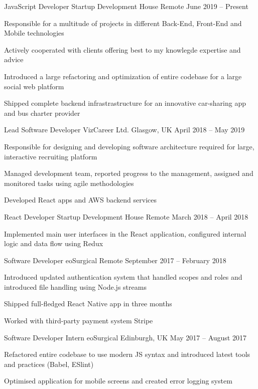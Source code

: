 \documentclass[]{awesome-cv}
\begin{document}
\vspace{-5mm}
\begin{cventries}
  \cventry
  {JavaScript Developer}
  {Startup Development House}
  {Remote}
  {June 2019 – Present}
  {\begin{cvitems}
    \item {Responsible for a multitude of projects in different Back-End, Front-End and Mobile technologies}
    \item {Actively cooperated with clients offering best to my knowlegde expertise and advice}
    \item {Introduced a large refactoring and optimization of entire codebase for a large social web platform}
    \item {Shipped complete backend infrastrastructure for an innovative car-sharing app and bus charter provider}
    \end{cvitems}}
  \cventry
  {Lead Software Developer}
  {VizCareer Ltd.}
  {Glasgow, UK}
  {April 2018 – May 2019}
  {\begin{cvitems}
    \item {Responsible for designing and developing software architecture required for large, interactive recruiting platform}
    \item {Managed development team, reported progress to the management, assigned and monitored tasks using agile methodologies}
    \item {Developed React apps and AWS backend services}
    \end{cvitems}}
	\cventry
	{React Developer}
	{Startup Development House}
	{Remote}
	{March 2018 – April 2018}
	{\begin{cvitems}
		\item {Implemented main user interfaces in the React application, configured internal logic and data flow using Redux}
		\end{cvitems}}
  \cventry
  {Software Developer}
  {eoSurgical}
  {Remote}
  {September 2017 – February 2018}
  {\begin{cvitems}
    \item {Introduced updated authentication system that handled scopes and roles and introduced file handling using Node.js streams}
    \item {Shipped full-fledged React Native app in three months}
    \item {Worked with third-party payment system Stripe}
    \end{cvitems}}
  \cventry
  {Software Developer Intern}
  {eoSurgical}
  {Edinburgh, UK}
  {May 2017 – August 2017}
  {\begin{cvitems}
    \item {Refactored entire codebase to use modern JS syntax and introduced latest tools and practices (Babel, ESlint)}
    \item {Optimised application for mobile screens and created error logging system}
    \end{cvitems}}
\end{cventries}
\end{document}
